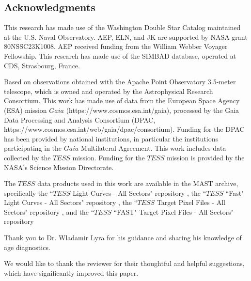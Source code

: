 \documentclass{aastex631}
\newcommand{\rev}[1]{{\color{black} #1}}
\begin{document}
\begin{acknowledgments}
\section{Acknowledgments}
This research has made use of the Washington Double Star Catalog maintained at the U.S. Naval Observatory.  AEP, ELN, and JK are supported by NASA grant 80NSSC23K1008. AEP received funding from the William Webber Voyager Fellowship. This research has made use of the SIMBAD database,
operated at CDS, Strasbourg, France.


\rev{Based on observations obtained with the Apache Point Observatory 3.5-meter telescope, which is owned and operated by the Astrophysical Research Consortium. This work has made use of data from the European Space Agency (ESA) mission $Gaia$
(https://www.cosmos.esa.int/gaia), processed by the Gaia Data Processing and Analysis Consortium (DPAC, https://www.cosmos.esa.int/web/gaia/dpac/consortium). Funding for the DPAC has been
provided by national institutions, in particular the institutions participating in the $Gaia$ Multilateral Agreement.  This work includes data
collected by the $TESS$ mission. Funding for the $TESS$ mission is provided by the NASA's Science Mission Directorate.}

\rev{The $TESS$ data products used in this work are available in the MAST archive, specifically the ``$TESS$ Light Curves - All Sectors" repository \citep{10.17909/t9-nmc8-f686}, the  ``$TESS$ ``Fast" Light Curves - All Sectors" repository \citep{https://doi.org/10.17909/t9-st5g-3177}, the  ``$TESS$ Target Pixel Files - All Sectors" repository \citep{https://doi.org/10.17909/t9-yk4w-zc73}, and the ``$TESS$ ``FAST" Target Pixel Files - All Sectors" repository \citep{https://doi.org/10.17909/t9-tcn7-7g94}}

Thank you to Dr. Wladamir Lyra for his guidance and sharing his knowledge of age diagnostics.

\rev{We would like to thank the reviewer for their thoughtful and helpful suggestions, which have significantly improved this paper.}
%


\end{acknowledgments}
\end{document}
